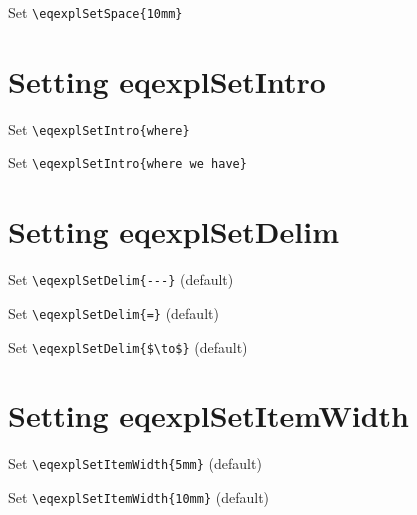 \documentclass{article}
\begin{document}
Set \verb+\eqexplSetSpace{10mm}+
\eqexplSetSpace{10mm}
\begin{eqexpl}
  \testList
\end{eqexpl}

\eqexplSetSpace{}

\section{Setting eqexplSetIntro}

Set \verb+\eqexplSetIntro{where}+
\begin{eqexpl}
  \testList
\end{eqexpl}

Set \verb+\eqexplSetIntro{where we have}+
\begin{eqexpl}
  \testList
\end{eqexpl}

\eqexplSetIntro{}

\section{Setting eqexplSetDelim}

Set \verb+\eqexplSetDelim{---}+ (default)
\eqexplSetDelim{---}
\begin{eqexpl}
  \testList
\end{eqexpl}

Set \verb+\eqexplSetDelim{=}+ (default)
\eqexplSetDelim{=}
\begin{eqexpl}
  \testList
\end{eqexpl}

Set \verb+\eqexplSetDelim{$\to$}+ (default)
\eqexplSetDelim{$\to$}
\begin{eqexpl}
  \testList
\end{eqexpl}

\eqexplSetDelim{---}

\section{Setting eqexplSetItemWidth}

Set \verb+\eqexplSetItemWidth{5mm}+ (default)
\eqexplSetItemWidth{5mm}
\begin{eqexpl}
  \testList
\end{eqexpl}

Set \verb+\eqexplSetItemWidth{10mm}+ (default)
\eqexplSetItemWidth{10mm}
\begin{eqexpl}
  \testList
\end{eqexpl}
\end{document}
